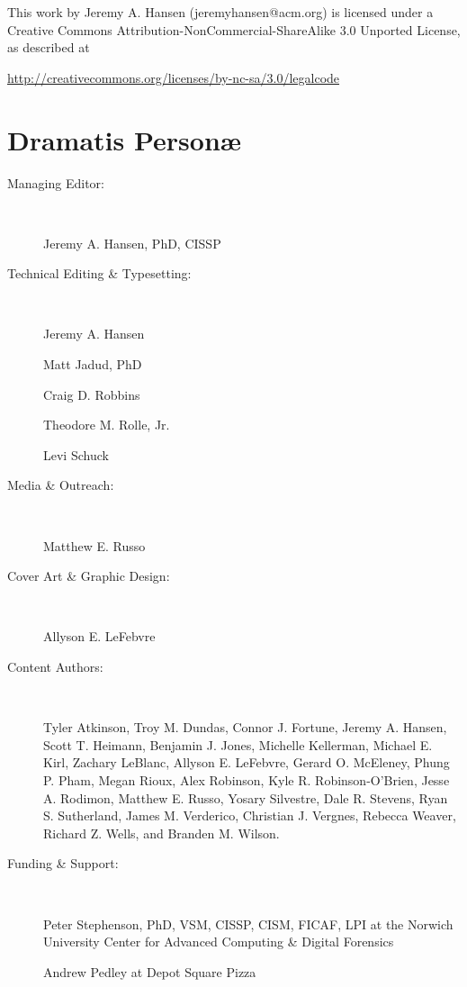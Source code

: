 \documentclass[11pt,final]{book}
\begin{document}
\vspace{1in}



\noindent This work by Jeremy A. Hansen (jeremyhansen@acm.org) is licensed under a Creative Commons Attribution-NonCommercial-ShareAlike 3.0 Unported License, as described at \newline

\noindent \footnotesize \url{http://creativecommons.org/licenses/by-nc-sa/3.0/legalcode}







   \chapter*{Dramatis Person\ae}

 \begin{description}

 \item[Managing Editor:] ~
 
 Jeremy A. Hansen, PhD, CISSP

 \item[Technical Editing \& Typesetting:] ~
 
 Jeremy A. Hansen
 
 Matt Jadud, PhD
 
 Craig D. Robbins
 
 Theodore M. Rolle, Jr.
 
 Levi Schuck

 \item[Media \& Outreach:] ~
 
 Matthew E. Russo

 \item[Cover Art \& Graphic Design:] ~
 
 Allyson E. LeFebvre

 \item[Content Authors:]\label{ContentAuthors} ~
 
Tyler Atkinson,
Troy M. Dundas,
Connor J. Fortune,
Jeremy A. Hansen,
Scott T. Heimann,
Benjamin J. Jones,
Michelle Kellerman,
Michael E. Kirl,
Zachary LeBlanc,
Allyson E. LeFebvre,
Gerard O. McEleney,
Phung P. Pham,
Megan Rioux,
Alex Robinson,
Kyle R. Robinson-O'Brien,
Jesse A. Rodimon,
Matthew E. Russo,
Yosary Silvestre,
Dale R. Stevens,
Ryan S. Sutherland,
James M. Verderico,
Christian J. Vergnes,
Rebecca Weaver,
Richard Z. Wells, and
Branden M. Wilson.

 \item[Funding \& Support:] ~
 
Peter Stephenson, PhD, VSM, CISSP, CISM, FICAF, LPI at the Norwich University Center for Advanced Computing \& Digital Forensics

Andrew Pedley at Depot Square Pizza
 \end{description}
\end{document}
